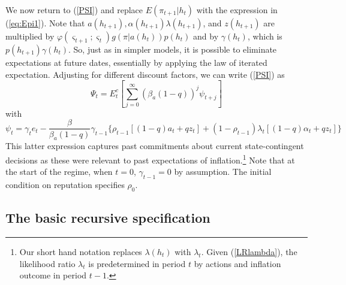 \documentclass[12pt,letter,leqno]{article}
\theoremstyle{asn}
\theoremstyle{lem}
\theoremstyle{slem}
\theoremstyle{prop}
\theoremstyle{appprop}
\theoremstyle{rem}
\theoremstyle{defn}
\begin{document}
We now return to (\ref{PSI}) and replace $ E(\pi _{t+1}|h_{t})$
with the expression in (\ref{eq:Epi1}). Note that $a(h_{t+1}),\alpha(h_{t+1})\lambda(h_{t+1})$, and $z(h_{t+1})$ are multiplied by $\varphi(\varsigma_{t+1};\varsigma_{t}) g(\pi |a(h_{t}))p(h_t)$ and by $\gamma(h_{t})$, which is $p(h_{t+1}) \gamma(h_{t})$. So, just as in simpler models, it is possible to eliminate expectations at future dates, essentially by applying the law of iterated expectation.  Adjusting for different discount factors, we can write (\ref{PSI}) as
\begin{equation}
\Psi_t=E^c_t[\sum_{j=0}^{\infty }(\beta_{a}(1-q))^{j}\psi_{t+j}]\label{PSIagain}
\end{equation}%
with 
\begin{equation}
\psi _{t}=\gamma_t e_t-\frac{\beta }{\beta_{a}(1-q)}\gamma _{t-1}\{ \rho
_{t-1}[(1-q)a_{t}+qz_{t}]+(1-\rho _{t-1})\lambda _{t}[(1-q)\alpha
_{t}+qz_{t}]\} 
\label{app:psi}
\end{equation}%
This latter expression captures past commitments about current state-contingent
decisions as these were relevant to past expectations of inflation.\footnote{Our short hand notation replaces $\lambda(h_t)$ with $\lambda_t$. Given (\ref{LRlambda}), the likelihood ratio $\lambda_t$ is predetermined in period $t$ by actions and inflation outcome in period $t-1$.} Note that at the start of the regime, when $t=0$, $\gamma_{t-1}=0$ by assumption. The initial condition on reputation specifies $\rho_{0}$.

\subsection{The basic recursive specification}\label{appsec:recursive8}
\end{document}
